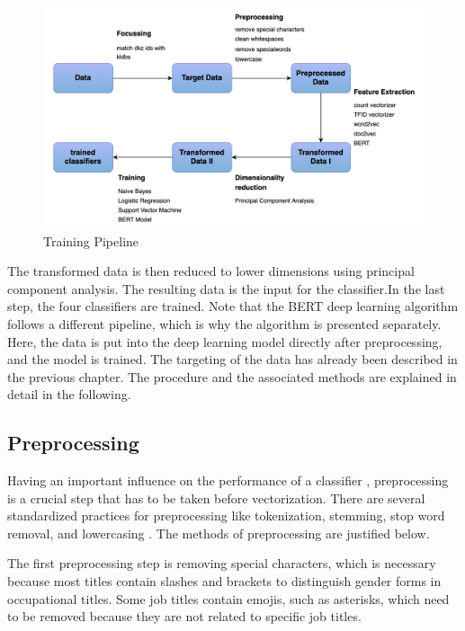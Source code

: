 \documentclass[12pt, a4paper, titlepage]{article}
\begin{document}
\begin{figure}[hb!]
  \center
  \includegraphics[scale=0.5]{pipeline_MA.png}
  \caption{\label{fig: F8} Training Pipeline}
\end{figure}

The transformed data is then reduced to lower dimensions using principal component analysis. The resulting data is the input for the classifier.In the last step, the four classifiers are trained. Note that the \ac{BERT} deep learning algorithm follows a different pipeline, which is why the algorithm is presented separately. Here, the data is put into the deep learning model directly after preprocessing, and the model is trained. The targeting of the data has already been described in the previous chapter. The procedure and the associated methods are explained in detail in the following.

\subsection{Preprocessing}
Having an important influence on the performance of a classifier \citep{uysal2014, hacohen2020, gonccalves2005}, preprocessing is a crucial step that has to be taken before vectorization. There are several standardized practices for preprocessing like tokenization, stemming, stop word removal, and lowercasing \citep{alsmadi2019}. The methods of preprocessing are justified below.

The first preprocessing step is removing special characters, which is necessary because most titles contain slashes and brackets to distinguish gender forms in occupational titles. Some job titles contain emojis, such as asterisks, which need to be removed because they are not related to specific job titles. 
\end{document}
